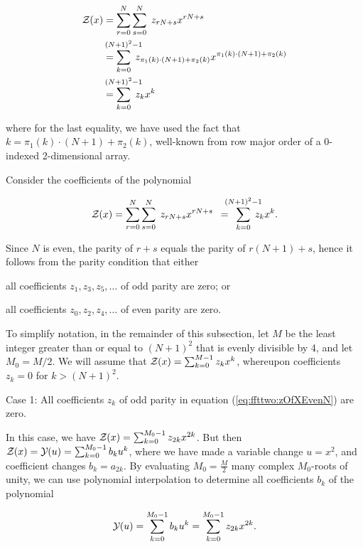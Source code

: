\begin{align}
\label{eq:ffttwo:polyRecEvenN}
\begin{split}
\emZ{} &= \sum_{r=0}^{N} \sum_{s=0}^{N}\; z_{rN+s} x^{rN+s} \\
&=
\sum_{k=0}^{\mathclap{(N+1)^2-1}}\; z_{\pi_1(k)\cdot (N+1) + \pi_2(k)}
x^{\pi_1(k)\cdot (N+1) + \pi_2(k)} \\
&=
\sum_{k=0}^{\mathclap{(N+1)^2-1}}\; z_k x^k
\end{split}
\end{align}

where for the last equality, we have used the fact that
$k = \pi_1(k)\cdot (N+1)+\pi_2(k)$, well-known from
row major order of a 0-indexed 2-dimensional array.

Consider the coefficients of the polynomial

\begin{align}
\label{eq:ffttwo:zOfXEvenN}
\emZ{} = \sum_{r=0}^{N} \sum_{s=0}^{N}\; z_{rN+s} x^{rN+s}
\enspace=\enspace\sum_{k=0}^{\mathclap{(N+1)^2-1}}\; z_k x^k.
\end{align}

Since $N$ is even, the parity of $r+s$ equals the parity of
$r(N+1)+s$, hence  it follows from the parity condition that either
\begin{inparaenum}[\em 1\upshape)]
\item all coefficients $z_1,z_3,z_5,\dots$ of odd parity are zero;
or \item all coefficients $z_0,z_2,z_4,\dots$ of even parity are zero.
\end{inparaenum}
To simplify notation, in the remainder of this subsection, let $M$ be
the least integer greater than or equal to $(N+1)^2$ that is evenly divisible
by 4, and let $M_0=M/2$. We will assume that ${\mathcal Z}_{}(x) = \sum_{k=0}^{M-1}
z_k x^k$, whereupon coefficients $z_k=0$ for $k>(N+1)^2$.

\medskip
{\sc Case 1}: All coefficients $z_k$ of odd parity in
equation (\ref{eq:ffttwo:zOfXEvenN}) are zero.
\smallskip

In this case, we have
${\mathcal Z}_{}(x) = \sum_{k=0}^{M_0-1} z_{2k} x^{2k}$. But then
${\mathcal Z}_{}(x) = {\mathcal Y}_{}(u) = \sum_{k=0}^{M_0-1} b_k u^k$,
where we have made a variable change $u=x^2$, and coefficient changes
$b_k = a_{2k}$.
By evaluating $M_0=\frac{M}{2}$ many complex
$M_0$-roots of unity, we can
use polynomial interpolation to determine all coefficients $b_k$ of
the polynomial

\begin{align}
{\mathcal Y}_{}(u) = \sum_{k=0}^{M_0-1} b_k u^k = \sum_{k=0}^{M_0-1} z_{2k} x^{2k}.
\end{align}

